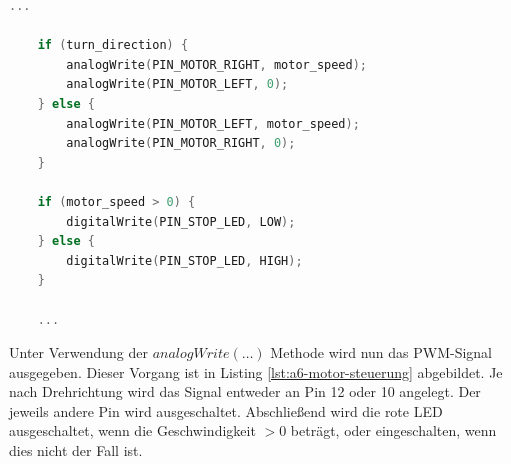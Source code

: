 \begin{lstlisting}[language=C,label={lst:a6-motor-steuerung}, caption={Ansteuerung des Motors}]
    ...

    if (turn_direction) {
        analogWrite(PIN_MOTOR_RIGHT, motor_speed);
        analogWrite(PIN_MOTOR_LEFT, 0);
    } else {
        analogWrite(PIN_MOTOR_LEFT, motor_speed);
        analogWrite(PIN_MOTOR_RIGHT, 0);
    }

    if (motor_speed > 0) {
        digitalWrite(PIN_STOP_LED, LOW);
    } else {
        digitalWrite(PIN_STOP_LED, HIGH);
    }

    ...
\end{lstlisting}

Unter Verwendung der $analogWrite(\dots)$ Methode wird nun das PWM-Signal ausgegeben.
Dieser Vorgang ist in Listing \ref{lst:a6-motor-steuerung} abgebildet.
Je nach Drehrichtung wird das Signal entweder an Pin 12 oder 10 angelegt.
Der jeweils andere Pin wird ausgeschaltet.
Abschließend wird die rote LED ausgeschaltet, wenn die Geschwindigkeit $> 0$ beträgt, oder eingeschalten, wenn dies nicht der Fall ist.


